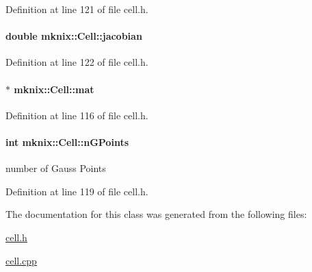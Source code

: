 Definition at line 121 of file cell.\+h.

\hypertarget{classmknix_1_1_cell_a4922bf34ba543606a8d9c5ca4847b589}{}
\paragraph[{jacobian}]{\setlength{\rightskip}{0pt plus 5cm}double mknix\+::\+Cell\+::jacobian\hspace{0.3cm}{\ttfamily [protected]}}\label{classmknix_1_1_cell_a4922bf34ba543606a8d9c5ca4847b589}


Definition at line 122 of file cell.\+h.

\hypertarget{classmknix_1_1_cell_a83ca13ff89196b3ab378d2a28820a08e}{}
\paragraph[{mat}]{$\ast$ mknix\+::\+Cell\+::mat\hspace{0.3cm}{\ttfamily [protected]}}\label{classmknix_1_1_cell_a83ca13ff89196b3ab378d2a28820a08e}


Definition at line 116 of file cell.\+h.

\hypertarget{classmknix_1_1_cell_a7d406d6e6f58c14da07387723986ae38}{}
\paragraph[{n\+G\+Points}]{\setlength{\rightskip}{0pt plus 5cm}int mknix\+::\+Cell\+::n\+G\+Points\hspace{0.3cm}{\ttfamily [protected]}}\label{classmknix_1_1_cell_a7d406d6e6f58c14da07387723986ae38}
number of Gauss Points 

Definition at line 119 of file cell.\+h.



The documentation for this class was generated from the following files\+:\begin{DoxyCompactItemize}
\item 
\hyperlink{cell_8h}{cell.\+h}\item 
\hyperlink{cell_8cpp}{cell.\+cpp}\end{DoxyCompactItemize}
